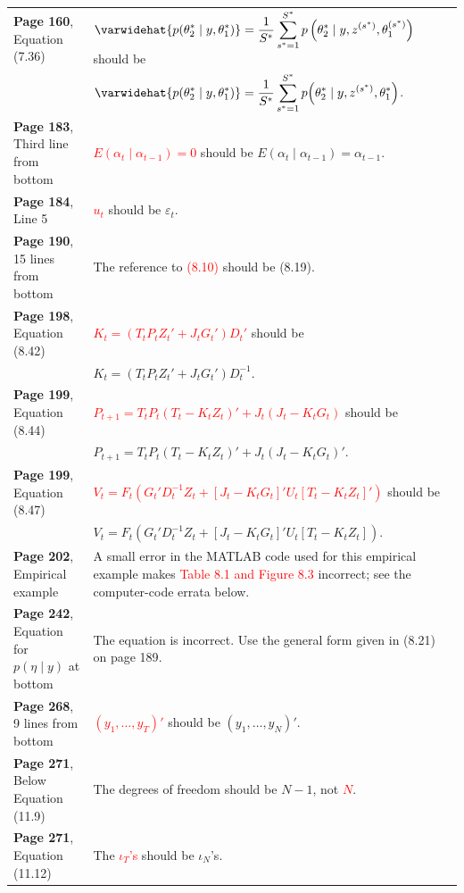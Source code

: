 \documentclass[10pt, a4paper]{article}
\newcommand{\red}[1]{\textcolor{red}{#1}}
\newcommand{\green}[1]{\textcolor{green!50!black}{#1}}
\begin{document}
\begin{longtable}{|R{.38\textwidth}|R{.58\textwidth}|}
	\textbf{Page 160}, Equation (7.36) &  \red{$\displaystyle \varwidehat{p(\theta_2^* \mid y,\theta_1^*)} = \dfrac{1}{S^*}\sum_{s^*=1}^{S^*} p\left(\theta_2^* \mid y,z^{(s^*)},\theta_1^{(s^*)}\right)$} should be \\
	& \green{$\displaystyle \varwidehat{p(\theta_2^*\mid y,\theta_1^*)}=\frac{1}{S^*}\sum_{s^*=1}^{S^*}p\!\left(\theta_2^*\mid y,z^{(s^*)},\theta_1^*\right)$}. \\ \hline
	\textbf{Page 183}, Third line from bottom & \red{$E(\alpha_t\mid\alpha_{t-1})=0$} should be \green{$E(\alpha_t\mid\alpha_{t-1})=\alpha_{t-1}$}. \\ \hline	
	\textbf{Page 184}, Line 5 & \red{$u_t$} should be \green{$\varepsilon_t$}. \\ \hline	
	\textbf{Page 190}, 15 lines from bottom & The reference to \red{(8.10)} should be \green{(8.19)}. \\ \hline	
	\textbf{Page 198}, Equation (8.42) &  \red{$\displaystyle K_t=(T_tP_tZ_t'+J_tG_t')D_t'$} should be \\
	& \green{$\displaystyle K_t=(T_tP_tZ_t'+J_tG_t')D_t^{-1}$}. \\ \hline	
	\textbf{Page 199}, Equation (8.44) & \red{$\displaystyle P_{t+1}=T_tP_t(T_t-K_tZ_t)'+J_t(J_t-K_tG_t)$} should be \\
	& \green{$\displaystyle P_{t+1}=T_tP_t(T_t-K_tZ_t)'+J_t(J_t-K_tG_t)'$}. \\ \hline	
	\textbf{Page 199}, Equation (8.47) & \red{$\displaystyle V_t=F_t\left(G_t'D_t^{-1}Z_t+[J_t-K_tG_t]'U_t[T_t-K_tZ_t]'\right)$} should be \\
	& \green{$\displaystyle V_t=F_t\left(G_t'D_t^{-1}Z_t+[J_t-K_tG_t]'U_t[T_t-K_tZ_t]\right)$}. \\ \hline	
	\textbf{Page 202}, Empirical example & A small error in the MATLAB code used for this empirical example makes \red{Table 8.1 and Figure 8.3} incorrect; see the computer-code errata below. \\ \hline	
	\textbf{Page 242}, Equation for $p(\eta\mid y)$ at bottom & The equation is incorrect. Use the general form given in \green{(8.21) on page 189}. \\ \hline	
	\textbf{Page 268}, 9 lines from bottom & \red{$(y_1,\ldots,y_T)'$} should be \green{$(y_1,\ldots,y_N)'$}. \\ \hline	
	\textbf{Page 271}, Below Equation (11.9) & The degrees of freedom should be \green{$N-1$}, not \red{$N$}. \\ \hline	
	\textbf{Page 271}, Equation (11.12) & The \red{$\iota_T$'s} should be \green{$\iota_N$'s}. \\ \hline	

\end{longtable}
\end{document}
